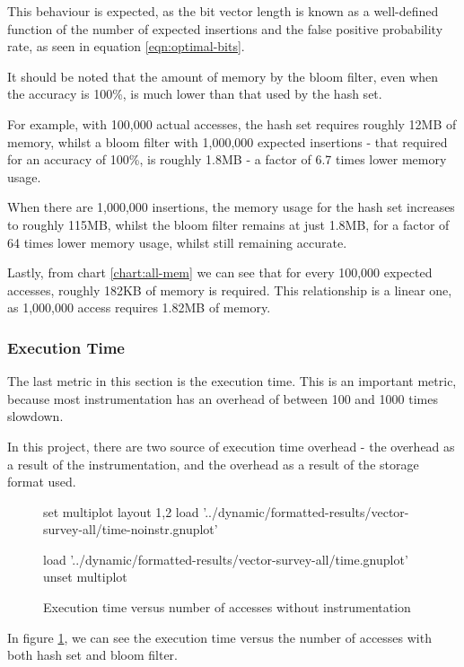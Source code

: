 		This behaviour is expected, as the bit vector length is known as a well-defined function of the number of expected insertions and the false positive probability rate, as seen in equation \ref{eqn:optimal-bits}.
		
		It should be noted that the amount of memory by the bloom filter, even when the accuracy is 100\%, is much lower than that used by the hash set.
		
		For example, with 100,000 actual accesses, the hash set requires roughly 12MB of memory, whilst a bloom filter with 1,000,000 expected insertions - that required for an accuracy of 100\%, is roughly 1.8MB - a factor of 6.7 times lower memory usage.
		
		When there are 1,000,000 insertions, the memory usage for the hash set increases to roughly 115MB, whilst the bloom filter remains at just 1.8MB, for a factor of 64 times lower memory usage, whilst still remaining accurate.
		
		Lastly, from chart \ref{chart:all-mem} we can see that for every 100,000 expected accesses, roughly 182KB of memory is required. This relationship is a linear one, as 1,000,000 access requires 1.82MB of memory.
	
		\subsubsection{Execution Time} \label{sec:results/all/time}
		The last metric in this section is the execution time. This is an important metric, because most instrumentation has an overhead of between 100 and 1000 times slowdown.
		
		In this project, there are two source of execution time overhead - the overhead as a result of the instrumentation, and the overhead as a result of the storage format used.
		
		\begin{figure}
			\centering
			\begin{gnuplot}[terminal=pdf]
				set multiplot layout 1,2
					load '../dynamic/formatted-results/vector-survey-all/time-noinstr.gnuplot'
				
					load '../dynamic/formatted-results/vector-survey-all/time.gnuplot'
				unset multiplot
			\end{gnuplot}
			\caption{Execution time versus number of accesses without instrumentation}
			\label{chart:all-time}
		\end{figure}
		
		In figure \ref{chart:all-time}, we can see the execution time versus the number of accesses with both hash set and bloom filter.
		
